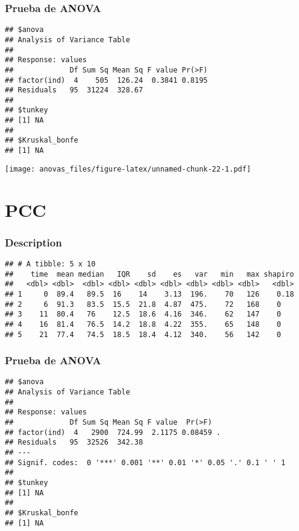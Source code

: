 \documentclass[
]{article}
\begin{document}
\hypertarget{prueba-de-anova-10}{%
\subsubsection{Prueba de ANOVA}\label{prueba-de-anova-10}}

\begin{verbatim}
## $anova
## Analysis of Variance Table
## 
## Response: values
##             Df Sum Sq Mean Sq F value Pr(>F)
## factor(ind)  4    505  126.24  0.3841 0.8195
## Residuals   95  31224  328.67               
## 
## $tunkey
## [1] NA
## 
## $Kruskal_bonfe
## [1] NA
\end{verbatim}

\texttt{[image: anovas\_files/figure-latex/unnamed-chunk-22-1.pdf]}

\hypertarget{pcc}{%
\section{PCC}\label{pcc}}

\hypertarget{description-11}{%
\subsubsection{Description}\label{description-11}}

\begin{verbatim}
## # A tibble: 5 x 10
##    time  mean median   IQR    sd    es   var   min   max shapiro
##   <dbl> <dbl>  <dbl> <dbl> <dbl> <dbl> <dbl> <dbl> <dbl>   <dbl>
## 1     0  89.4   89.5  16    14    3.13  196.    70   126    0.18
## 2     6  91.3   83.5  15.5  21.8  4.87  475.    72   168    0   
## 3    11  80.4   76    12.5  18.6  4.16  346.    62   147    0   
## 4    16  81.4   76.5  14.2  18.8  4.22  355.    65   148    0   
## 5    21  77.4   74.5  18.5  18.4  4.12  340.    56   142    0
\end{verbatim}

\hypertarget{prueba-de-anova-11}{%
\subsubsection{Prueba de ANOVA}\label{prueba-de-anova-11}}

\begin{verbatim}
## $anova
## Analysis of Variance Table
## 
## Response: values
##             Df Sum Sq Mean Sq F value  Pr(>F)  
## factor(ind)  4   2900  724.99  2.1175 0.08459 .
## Residuals   95  32526  342.38                  
## ---
## Signif. codes:  0 '***' 0.001 '**' 0.01 '*' 0.05 '.' 0.1 ' ' 1
## 
## $tunkey
## [1] NA
## 
## $Kruskal_bonfe
## [1] NA
\end{verbatim}
\end{document}
